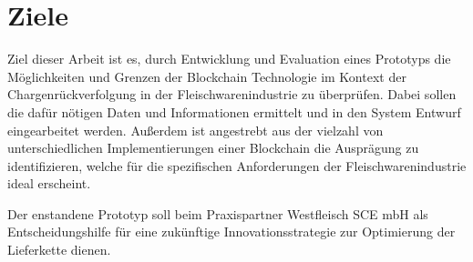 \section{Ziele}

Ziel dieser Arbeit ist es, durch Entwicklung und Evaluation eines Prototyps die Möglichkeiten und Grenzen der Blockchain Technologie im Kontext der Chargenrückverfolgung in der Fleischwarenindustrie zu überprüfen. Dabei sollen die dafür nötigen Daten und Informationen ermittelt und in den System Entwurf eingearbeitet werden. Außerdem ist angestrebt aus der vielzahl von unterschiedlichen Implementierungen einer Blockchain die Ausprägung zu identifizieren, welche für die spezifischen Anforderungen der Fleischwarenindustrie ideal erscheint.

Der enstandene Prototyp soll beim Praxispartner Westfleisch SCE mbH als Entscheidungshilfe für eine zukünftige Innovationsstrategie zur Optimierung der Lieferkette dienen.




